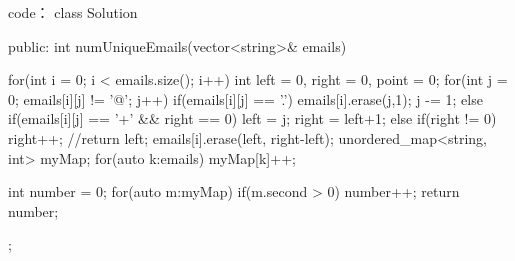 code：
class Solution {
public:
    int numUniqueEmails(vector<string>& emails) {
        
        for(int i = 0; i < emails.size(); i++)
        {
            int left = 0, right = 0, point = 0;
            for(int j = 0; emails[i][j] != '@'; j++)
            {
                if(emails[i][j] == '.')
                {
                    emails[i].erase(j,1); j -= 1;
                }
                else if(emails[i][j] == '+' && right == 0)
                {
                    left = j; right = left+1;
                }
                else if(right != 0) right++;
            }
            //return left;
            emails[i].erase(left, right-left);
        }
        unordered_map<string, int> myMap;
        for(auto k:emails)
            myMap[k]++;
        
        int number = 0;
        for(auto m:myMap)
        {
            if(m.second > 0) number++;
        } 
        return number;
    }
};